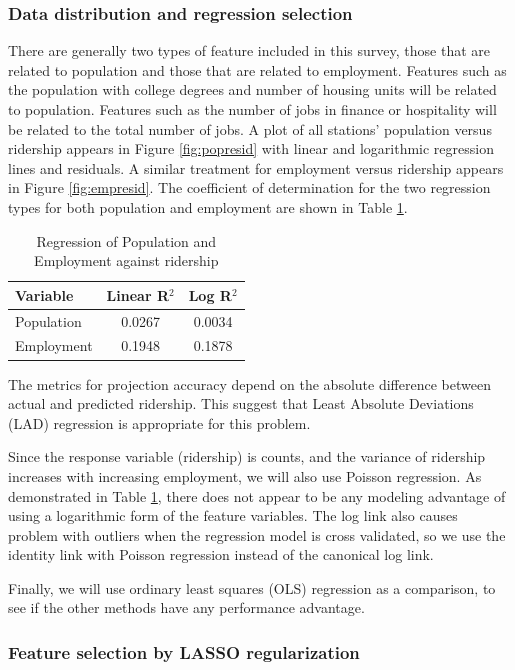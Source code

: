 \documentclass{article}
\begin{document}
\subsubsection{Data distribution and regression selection}
There are generally two types of feature included in this survey, those that are related to population and those that are related to employment. Features such as the population with college degrees and number of housing units will be related to population. Features such as the number of jobs in finance or hospitality will be related to the total number of jobs. A plot of all stations' population versus ridership appears in Figure \ref{fig:popresid} with linear and logarithmic regression lines and residuals. A similar treatment for employment versus ridership appears in Figure \ref{fig:empresid}. The coefficient of determination for the two regression types for both population and employment are shown in Table \ref{tab:regr2}.

\begin{table}[H]\label{tab:regr2}
\centering
\begin{tabular}{lcc}
\toprule Variable&Linear R$^2$&Log R$^2$ \\ 
\midrule Population&0.0267&0.0034 \\
Employment&0.1948&0.1878 \\
\bottomrule
\end{tabular}
\caption{Regression of Population and Employment against ridership}
\end{table}

The metrics for projection accuracy depend on the absolute difference between actual and predicted ridership. This suggest that Least Absolute Deviations (LAD) regression is appropriate for this problem. 

Since the response variable (ridership) is counts, and the variance of ridership increases with increasing employment, we will also use Poisson regression. As demonstrated in Table \ref{tab:regr2}, there does not appear to be any modeling advantage of using a logarithmic form of the feature variables. The log link also causes problem with outliers when the regression model is cross validated, so we use the identity link with Poisson regression instead of the canonical log link. 

Finally, we will use ordinary least squares (OLS) regression as a comparison, to see if the other methods have any performance advantage. 

\subsubsection{Feature selection by LASSO regularization}
\end{document}
